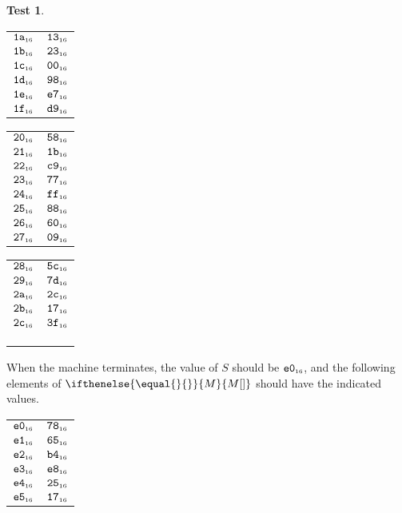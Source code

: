 \documentclass[a4paper,12pt]{article}
\makeatletter
\newcommand{\num}[1]{\texttt{\MakeLowercase{#1}}}
\newcommand{\hex}[1]{\num{#1}_{\textup{\tiny 16}}}
\newcommand{\MEM}[1]{\ifthenelse{\equal{#1}{}}{M}{M[#1]}}
\newcommand{\SP}{S}
\theoremstyle{definition}
\newtheorem{test}{Test}
\newenvironment{memtable}{%
  \begin{trivlist}
    \item
    }{%
    \end{trivlist}}
\newenvironment{memcolumn}{%
  \begin{tabular}{@{}ll@{}}
    \hline}
    {%
    \hline
  \end{tabular}}
\newcommand{\memspace}{\qquad}
\makeatother
\begin{document}
\begin{test}
\begin{memtable}
\begin{memcolumn}
      $\hex{1A}$ & $\hex{13}$ \\
      $\hex{1B}$ & $\hex{23}$ \\
      $\hex{1C}$ & $\hex{00}$ \\
      $\hex{1D}$ & $\hex{98}$ \\
      $\hex{1E}$ & $\hex{E7}$ \\
      $\hex{1F}$ & $\hex{D9}$ \\
    \end{memcolumn}
    \memspace
    \begin{memcolumn}
      $\hex{20}$ & $\hex{58}$ \\
      $\hex{21}$ & $\hex{1B}$ \\
      $\hex{22}$ & $\hex{C9}$ \\
      $\hex{23}$ & $\hex{77}$ \\
      $\hex{24}$ & $\hex{FF}$ \\
      $\hex{25}$ & $\hex{88}$ \\
      $\hex{26}$ & $\hex{60}$ \\
      $\hex{27}$ & $\hex{09}$ \\
    \end{memcolumn}
    \memspace
    \begin{memcolumn}
      $\hex{28}$ & $\hex{5C}$ \\
      $\hex{29}$ & $\hex{7D}$ \\
      $\hex{2A}$ & $\hex{2C}$ \\
      $\hex{2B}$ & $\hex{17}$ \\
      $\hex{2C}$ & $\hex{3F}$ \\
      \\
      \\
      \\
    \end{memcolumn}
  \end{memtable}
  When the machine terminates, the value of $\SP$ should be $\hex{E0}$, and the following elements of $\MEM{}$ should have the indicated values.
  \begin{memtable}
    \begin{memcolumn}
      $\hex{E0}$ & $\hex{78}$ \\
      $\hex{E1}$ & $\hex{65}$ \\
      $\hex{E2}$ & $\hex{B4}$ \\
      $\hex{E3}$ & $\hex{E8}$ \\
      $\hex{E4}$ & $\hex{25}$ \\
      $\hex{E5}$ & $\hex{17}$ \\

\end{memcolumn}
\end{memtable}
\end{test}
\end{document}
